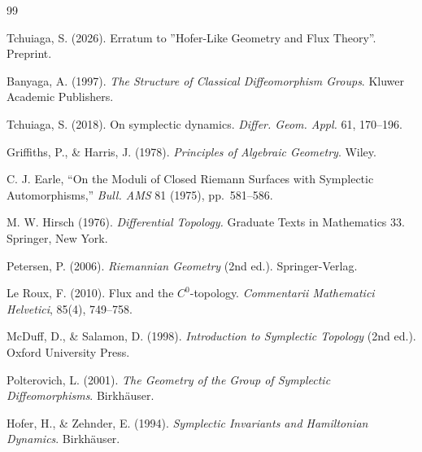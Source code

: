 \documentclass[11pt]{article}
\theoremstyle{definition}
\begin{document}
	\begin{thebibliography}{99}
		
		Tchuiaga, S. (2026). Erratum to ''Hofer-Like Geometry and Flux Theory''.
		Preprint.
		
		Banyaga, A. (1997).
		\emph{The Structure of Classical Diffeomorphism Groups}.
		Kluwer Academic Publishers.
		
		Tchuiaga, S. (2018). On symplectic dynamics.
		\emph{Differ. Geom. Appl.} 61, 170--196.
		
		Griffiths, P., \& Harris, J. (1978).
		\emph{Principles of Algebraic Geometry}.
		Wiley.
		
		C. J. Earle, ``On the Moduli of Closed Riemann Surfaces with Symplectic
		Automorphisms,'' \emph{Bull. AMS} 81 (1975), pp.~581--586.
		
		M. W. Hirsch (1976). \emph{Differential Topology.} Graduate Texts in
		Mathematics 33. Springer, New York.
		
		Petersen, P. (2006).
		\emph{Riemannian Geometry} (2nd ed.).
		Springer-Verlag.
		
		Le Roux, F. (2010).
		Flux and the $C^0$-topology.
		\emph{Commentarii Mathematici Helvetici}, 85(4), 749--758.
		
		McDuff, D., \& Salamon, D. (1998).
		\emph{Introduction to Symplectic Topology} (2nd ed.).
		Oxford University Press.
		
		Polterovich, L. (2001).
		\emph{The Geometry of the Group of Symplectic Diffeomorphisms}.
		Birkh\"auser.
		
		Hofer, H., \& Zehnder, E. (1994).
		\emph{Symplectic Invariants and Hamiltonian Dynamics}.
		Birkh\"auser.
		
	\end{thebibliography}
	
\end{document}
